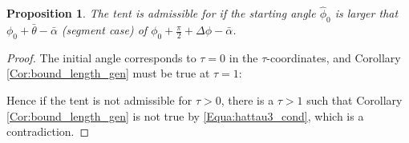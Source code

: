 \documentclass[reqno]{amsart}
\theoremstyle{definition} \newtheorem{definition}{Definition}[section]
\theoremstyle{definition} \newtheorem{remark}[definition]{Remark}
\theoremstyle{plain} \newtheorem{lemma}[definition]{Lemma}
\theoremstyle{plain} \newtheorem{proposition}[definition]{Proposition}
\theoremstyle{plain} \newtheorem{theorem}[definition]{Theorem}
\theoremstyle{plain} \newtheorem{corollary}[definition]{Corollary}
\theoremstyle{definition} \newtheorem{example}[definition]{Example}
\theoremstyle{plain} \newtheorem{claim}[clai]{Claim}
\theoremstyle{definition} \newtheorem{assumption}[definition]{Assumption}
\theoremstyle{definition} \newtheorem{observation}[definition]{Observation}
\newcommand{\1}{\mathbbm 1}
\numberwithin{equation}{section} %
\theoremstyle{plain} \newtheorem*{theorem*}{Theorem}
\theoremstyle{plain} \newtheorem{mthm}[maintheorem]{Main Theorem}
\theoremstyle{plain} \newtheorem*{mthm*}{Main Theorem}
\theoremstyle{plain} \newtheorem*{conjecture*}{Conjecture}
\theoremstyle{plain} \newtheorem{conjecture}[definition]{Conjecture}
\theoremstyle{plain} \newtheorem*{problem*}{Problem}
\begin{document}
\begin{proposition}
\label{Prop:tent_admissible}
The tent is admissible for if the starting angle $\hat \phi_0$ is larger that $\phi_0 + \bar \theta - \bar \alpha$ (segment case) of $\phi_0 + \frac{\pi}{2} + \Delta \phi - \bar \alpha$.
\end{proposition}

\begin{proof}
The initial angle corresponds to $\tau = 0$ in the $\tau$-coordinates, and Corollary \ref{Cor:bound_length_gen} must be true at $\tau = 1$: 

Hence if the tent is not admissible for $\tau > 0$, there is a $\tau > 1$ such that Corollary \ref{Cor:bound_length_gen} is not true by \eqref{Equa:hattau3_cond}, which is a contradiction. %
%
\end{proof}
\end{document}
